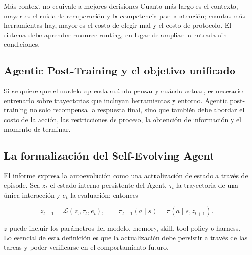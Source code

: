\begin{warningbox}{Más context no equivale a mejores decisiones}
Cuanto más largo es el contexto, mayor es el ruido de recuperación y la competencia por la atención; cuantas más herramientas hay, mayor es el costo de elegir mal y el costo de protocolo. El sistema debe aprender resource routing, en lugar de ampliar la entrada sin condiciones.
\end{warningbox}

\subsection{Agentic Post-Training y el objetivo unificado}

Si se quiere que el modelo aprenda cuándo pensar y cuándo actuar, es necesario entrenarlo sobre trayectorias que incluyan herramientas y entorno. Agentic post-training no solo recompensa la respuesta final, sino que también debe abordar el costo de la acción, las restricciones de proceso, la obtención de información y el momento de terminar.



\subsection{La formalización del Self-Evolving Agent}

El informe expresa la autoevolución como una actualización de estado a través de episode. Sea $z_t$ el estado interno persistente del Agent, $\tau_t$ la trayectoria de una única interacción y $e_t$ la evaluación; entonces

$$
z_{t+1}=\mathcal{L}(z_t,\tau_t,e_t),
\qquad
\pi_{t+1}(a\mid s)=\pi(a\mid s,z_{t+1}).
$$

$z$ puede incluir los parámetros del modelo, memory, skill, tool policy o harness. Lo esencial de esta definición es que la actualización debe persistir a través de las tareas y poder verificarse en el comportamiento futuro.


